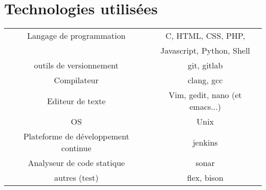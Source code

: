 \chapter{Technologies utilisées}
    \begin{center}
        \begin{tabular}{|c|c|}
            \hline
            Langage de programmation & C, HTML, CSS, PHP,\\
                & Javascript, Python, Shell
            \\ \hline
            outils de versionnement & git, gitlab \\ \hline
            Compilateur & clang, gcc \\ \hline
            Editeur de texte & Vim, gedit, nano (et emacs...) \\ \hline 
            OS & Unix \\ \hline
            Plateforme de développement continue & jenkins \\ \hline
            Analyseur de code statique & sonar \\ \hline
            autres (test) & flex, bison \\ \hline
        \end{tabular}
    \end{center}
